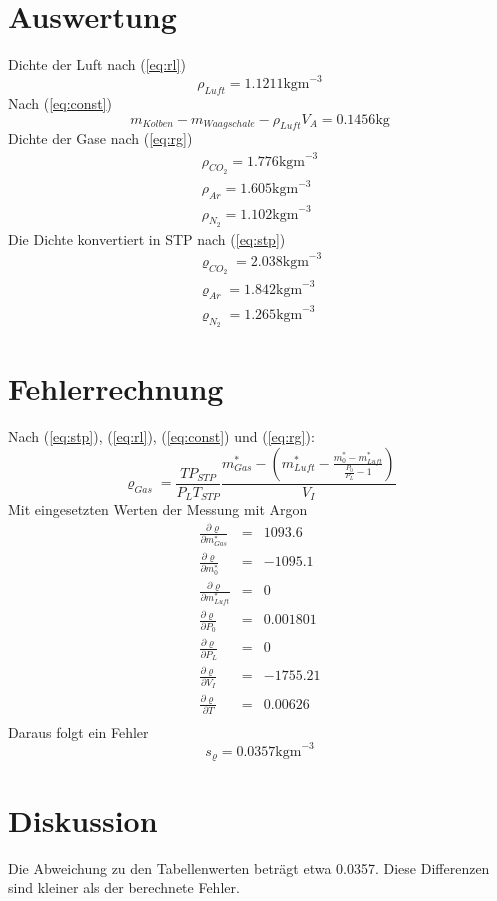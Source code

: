 \documentclass[12pt,a4paper]{article}
\begin{document}
\section*{Auswertung}
Dichte der Luft nach (\ref{eq:rl})
\[ \rho_{Luft} = 1.1211 \mbox{kgm}^{-3} \]
Nach (\ref{eq:const})
\[ m_{Kolben} - m_{Waagschale} - \rho_{Luft} V_A = 0.1456 \mbox{kg} \]
Dichte der Gase nach (\ref{eq:rg})
\begin{eqnarray*}
\rho_{CO_2} = 1.776 \mbox{kgm}^{-3} \\
\rho_{Ar} = 1.605 \mbox{kgm}^{-3} \\
\rho_{N_2} = 1.102 \mbox{kgm}^{-3}
\end{eqnarray*}
Die Dichte konvertiert in STP nach (\ref{eq:stp})
\begin{eqnarray*}
\varrho_{CO_2} = 2.038 \mbox{kgm}^{-3} \\
\varrho_{Ar} = 1.842 \mbox{kgm}^{-3} \\
\varrho_{N_2} = 1.265 \mbox{kgm}^{-3}
\end{eqnarray*}


\section*{Fehlerrechnung}
Nach (\ref{eq:stp}), (\ref{eq:rl}), (\ref{eq:const}) und (\ref{eq:rg}):
\[ \varrho _{Gas} = \frac{TP_{STP}}{P_L T_{STP}} \frac{m^*_{Gas} - \left(  m^*_{Luft} - \frac{m^*_0 - m^*_{Luft}}{\frac{P_0}{P_L}-1}\right) }{V_I} \]
Mit eingesetzten Werten der Messung mit Argon
\begin{eqnarray*}
\frac{\partial \varrho}{\partial m^*_{Gas}} & = & 1093.6 \\
\frac{\partial \varrho}{\partial m^*_{0}} & = & -1095.1 \\
\frac{\partial \varrho}{\partial m^*_{Luft}} & = & 0 \\
\frac{\partial \varrho}{\partial P_0} & = & 0.001801 \\
\frac{\partial \varrho}{\partial P_L} & = & 0 \\
\frac{\partial \varrho}{\partial V_I} & = & -1755.21 \\
\frac{\partial \varrho}{\partial T} & = & 0.00626 \\
\end{eqnarray*}
Daraus folgt ein Fehler
\[ s_\varrho = 0.0357 \mbox{kgm}^{-3} \]


\section*{Diskussion}
Die Abweichung zu den Tabellenwerten betr\"agt etwa 0.0357. Diese Differenzen sind kleiner als der berechnete Fehler.
\end{document}
